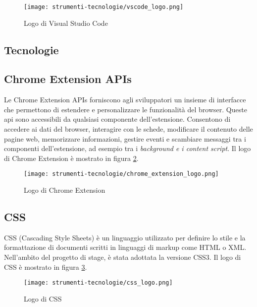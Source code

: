 \begin{figure}[H]
  \centering 
  \texttt{[image: strumenti-tecnologie/vscode\_logo.png]} 
  \caption{Logo di Visual Studio Code}
  \label{fig:logo_vscode} 
\end{figure}

\subsection{Tecnologie}

\subsection*{Chrome Extension APIs}

\par Le Chrome Extension APIs forniscono agli sviluppatori un insieme di interfacce che permettono di estendere e personalizzare le funzionalità del browser. Queste \gls{api} sono accessibili da qualsiasi componente dell’estensione. Consentono di accedere ai dati del browser, interagire con le schede, modificare il contenuto delle pagine web, memorizzare informazioni, gestire eventi e scambiare messaggi tra i componenti dell’estensione, ad esempio tra i \textit{background e i content script}. Il logo di Chrome Extension è mostrato in figura \ref{fig:logo_chrome_extension}.

\begin{figure}[H]
  \centering 
  \texttt{[image: strumenti-tecnologie/chrome\_extension\_logo.png]} 
  \caption{Logo di Chrome Extension}
  \label{fig:logo_chrome_extension} 
\end{figure}

\subsection*{CSS}

\par CSS (Cascading Style Sheets) è un linguaggio utilizzato per definire lo stile e la formattazione di documenti scritti in linguaggi di markup come HTML o XML. Nell’ambito del progetto di stage, è stata adottata la versione CSS3. Il logo di CSS è mostrato in figura \ref{fig:logo_css}.

\begin{figure}[H]
  \centering 
  \texttt{[image: strumenti-tecnologie/css\_logo.png]} 
  \caption{Logo di CSS}
  \label{fig:logo_css} 
\end{figure}

